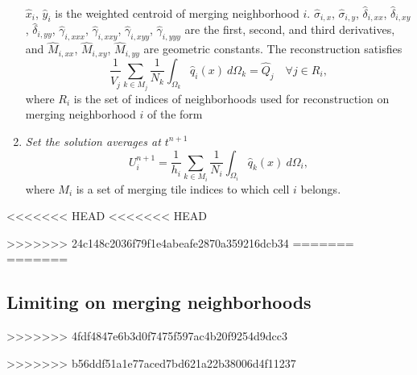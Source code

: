 \begin{enumerate}[label=Step \arabic*:]
\begin{equation}
\begin{aligned}
\end{aligned}
\end{equation}
$\hat x_i$, $\hat y_i$ is the weighted centroid of merging neighborhood $i$. $\hat \sigma_{i,x}$, $\hat \sigma_{i,y}$, $\hat \delta_{i,xx}$, $\hat \delta_{i,xy}$, $\hat \delta_{i,yy}$, $ \hat \gamma_{i,xxx}$, $\hat  \gamma_{i,xxy}$, $\hat  \gamma_{i,xyy}$, $\hat  \gamma_{i,yyy}$ are the first, second, and third derivatives, and $ \hat M_{i,xx}$, $\hat M_{i,xy}$,  $\hat M_{i,yy}$ are geometric constants.  The reconstruction satisfies
\begin{equation}\label{eq:qi}
\frac{1}{\hat V_j}\sum_{k \in M_j}\frac{1}{N_k}\int_{\Omega_k} \hat q_i(x)~d\Omega_k = \hat Q_j \quad \forall j \in R_i,
\end{equation}
where $R_i$ is the set of indices of neighborhoods used for reconstruction on merging neighborhood $i$ of the form


\item \textit{Set the solution averages at $t^{n+1}$}
	\begin{equation}\label{eq:final_update}
	U^{n+1}_i =  \frac{1}{h_i}\sum_{k \in M_{i}}\frac{1}{N_i}\int_{\Omega_i} \hat q_k(x)~d\Omega_i,
	\end{equation}
	where $M_i$ is a set of merging tile indices to which cell $i$ belongs.
\end{enumerate}

<<<<<<< HEAD
<<<<<<< HEAD
	
>>>>>>> 24c148c2036f79f1e4abeafe2870a359216dcb34
=======
=======
\subsection{Limiting on merging neighborhoods}
>>>>>>> 4fdf4847e6b3d0f7475f597ac4b20f9254d9dcc3



	
>>>>>>> b56ddf51a1e77aced7bd621a22b38006d4f11237
